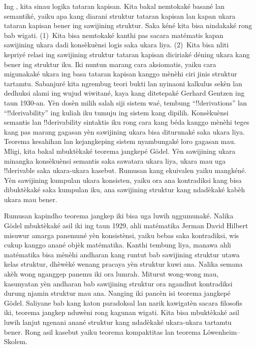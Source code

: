 Ing , kita sinau logika tataran kapisan. Kita
bakal nemtokaké basané lan semantiké, yaiku apa kang diarani struktur
tataran kapisan lan kapan ukara tataran kapisan bener ing sawijining
struktur. Saka kéné kita bisa nindakaké rong bab wigati.
(1)~Kita bisa nemtokaké kanthi pas sacara matématis kapan sawijining
ukara dadi konsèkuènsi logis saka ukara liya. (2)~Kita bisa nliti
kepriyé relasi ing sawijining struktur tataran kapisan diciriaké déning
ukara kang bener ing struktur iku. Iki nuntun marang cara aksiomatis,
yaiku cara migunakaké ukara ing basa tataran kapisan kanggo mènèhi ciri
jinis struktur tartamtu. Sabanjuré kita ngrembug teori bukti lan
nyinaoni kalkulus sekèn lan dedhuksi alami ing wujud wiwitané,
kaya kang ditetepaké Gerhard Gentzen ing taun 1930-an. Yèn dosèn
milih salah siji sistem waé, tembung “!!{derivation}s” lan
“!!{derivability}” ing kuliah iku tumuju ing sistem kang dipilih.
Konsèkuènsi semantis lan !!{derivability} sintaktis iku rong cara kang
béda kanggo mènèhi teges kang pas marang gagasan yèn sawijining ukara
bisa diturunaké saka ukara liya. Teorema kesahihan lan kejangkeping
sistem nyambungaké loro gagasan mau. Mligi, kita bakal mbuktèkaké
teorema jangkepé G\"odel. Yèn sawijining ukara minangka konsèkuènsi
semantis saka sawatara ukara liya, ukara mau uga !!{derivable} saka
ukara-ukara kasebut. Rumusan kang ekuivalen yaiku mangkéné. Yèn
sawijining kumpulan ukara konsisten, yaiku ora ana kontradiksi kang bisa
dibuktèkaké saka kumpulan iku, ana sawijining struktur kang ndadèkaké
kabèh ukara mau bener.

Rumusan kapindho teorema jangkep iki bisa uga luwih nggumunaké.
Nalika G\"odel mbuktèkaké asil iki ing taun 1929, ahli matématika
Jerman David Hilbert misuwur amarga panemuné yèn konsistènsi, yaiku
bebas saka kontradiksi, wis cukup kanggo anané objèk matématika.
Kanthi tembung liya, manawa ahli matématika bisa mènèhi andharan kang
runtut bab sawijining struktur utawa kelas struktur, dhèwèké wenang
pracaya yèn struktur kuwi ana. Nalika semana akèh wong nganggep
panemu iki ora lumrah. Miturut wong-wong mau, kasunyatan yèn
andharan bab sawijining struktur ora ngandhut kontradiksi durung
njamin struktur mau ana. Nanging iki pancèn isi teorema jangkepé
G\"odel. Saliyane bab kang katon paradoksal lan narik kawigatèn sacara
filosofis iki, teorema jangkep nduwèni rong kagunan wigati. Kita bisa
mbuktèkaké asil luwih lanjut ngenani anané struktur kang ndadèkaké
ukara-ukara tartamtu bener. Rong asil kasebut yaiku teorema
kompaktitas lan teorema L\"owenheim--Skolem.

